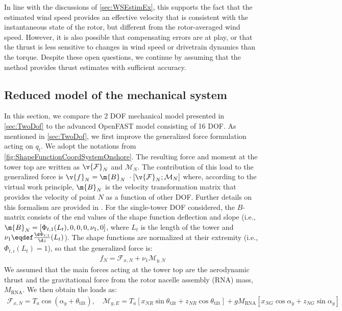 \documentclass[wes, manuscript]{copernicus}
\begin{document}
In line with the discussions of \autoref{sec:WSEstimEx}, this supports the fact that the estimated wind speed provides an effective velocity that is consistent with the instantaneous state of the rotor, but different from the rotor-averaged wind speed.
However, it is also possible that compensating errors are at play, or that the thrust is less sensitive to changes in wind speed or drivetrain dynamics than the torque. 
Despite these open questions, we continue by assuming that the method provides thrust estimates with sufficient accuracy.






\subsection{Reduced model of the mechanical system}
\label{sec:MechSys2DOF}
In this section, we compare the 2 DOF mechanical model presented in \autoref{sec:TwoDof} to the advanced OpenFAST model consisting of 16 DOF.
As mentioned in \autoref{sec:TwoDof}, we first improve the generalized force formulation acting on $q_t$.
We adopt the notations from \autoref{fig:ShapeFunctionCoordSystemOnshore}.
The resulting force and moment at the tower top are written as $\v{\mathcal{F}}_N$ and $\mathcal{M}_N$. The contribution of this load to the generalized force is $\v{f}_N=\m{B}_N\ \cdot [\mathcal{\v{F}}_N;\mathcal{M}_N]$ where, according to the virtual work principle, $\m{B}_N$ is the velocity transformation matrix that provides the velocity of point $N$ as a function of other DOF. Further details on this formalism are provided in \cite{branlard:2019flex}.
For the single-tower DOF considered, the $B$-matrix consists of the end values of the shape function deflection and slope (i.e., $\m{B}_N=[\Phi_{t,1}(L_t), 0, 0, 0,\nu_1 , 0 ]$, where $L_t$ is the length of the tower
and $\nu_1 \eqdef \frac{\d \Phi_{t,1}}{\d z}(L_t)$).
The shape functions are normalized at their extremity (i.e., $\Phi_{t,i}(L_t)=1$), so that the generalized force is:
\begin{align}
   f_N = \mathcal{F}_{x,N} + \nu_1 \mathcal{M}_{y,N}
\label{eq:fN}
\end{align}
% 
We assumed that the main forces acting at the tower top are the aerodynamic thrust and the gravitational force from the rotor nacelle assembly (RNA) mass, $M_\text{RNA}$. We then obtain the loads as:
\begin{align}
\mathcal{F}_{x,N} = T_a \cos(\alpha_y+ \theta_\text{tilt})
    ,\quad
\mathcal{M}_{y,E} = T_a \left[x_{NR} \sin\theta_\text{tilt} + z_{NR} \cos\theta_\text{tilt} \right]
+ g M_\text{RNA} \left[ x_{NG}\cos\alpha_y +  z_{NG}\sin\alpha_y \right]
\label{eq:FxMy}
\end{align}
\end{document}
